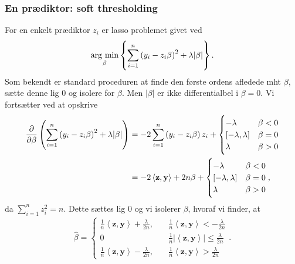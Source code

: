 \subsubsection{En prædiktor: soft thresholding}
For en enkelt prædiktor \(z_i\) er lasso problemet givet ved
\begin{align*}
\argmin_{\beta} \cbr{\sum_{i=1}^n \del{y_i - z_{i} \beta}^2 + \lambda \vert \beta \vert}.
\end{align*}
Som bekendt er standard proceduren at finde den første ordens afledede mht $\beta$, sætte denne lig 0 og isolere for $\beta$. 
Men \(\vert \beta \vert \) er ikke differentialbel i $\beta=0$.
Vi fortsætter ved at opskrive
\begin{align*}
\frac{\partial}{\partial \beta} \del{\sum_{i=1}^n \del{y_i - z_{i} \beta}^2 + \lambda \vert \beta \vert}
&= -2\sum_{i=1}^n \del{y_i - z_{i} \beta} z_i + \begin{cases}
-\lambda \quad &\beta < 0 \\
[-\lambda, \lambda] & \beta = 0 \\
\lambda & \beta >0 
\end{cases}  \\
&= -2 \left\langle \mathbf{z}, \mathbf{y} \right\rangle + 2n\beta + \begin{cases}
-\lambda \quad &\beta < 0 \\
[-\lambda, \lambda] & \beta = 0 \\
\lambda & \beta >0 
\end{cases},
\end{align*}
da $\sum_{i=1}^n z_i^2=n$. Dette sættes lig 0 og vi isolerer $\beta$, hvoraf vi finder, at
\begin{align}
\widehat{\beta} = \begin{cases}
\frac{1}{n} \left\langle \mathbf{z}, \mathbf{y} \right\rangle + \frac{\lambda}{2n}, &\frac{1}{n} \left\langle \mathbf{z}, \mathbf{y} \right\rangle < -\frac{\lambda}{2n} \\
0 &\frac{1}{n} \left\vert \left\langle \mathbf{z}, \mathbf{y} \right\rangle \right\vert \leq \frac{\lambda}{2n} \\
\frac{1}{n} \left\langle \mathbf{z}, \mathbf{y} \right\rangle - \frac{\lambda}{2n}, \quad &\frac{1}{n} \left\langle \mathbf{z}, \mathbf{y} \right\rangle > \frac{\lambda}{2n}
\end{cases}. \label{eq:2.10}
\end{align}
